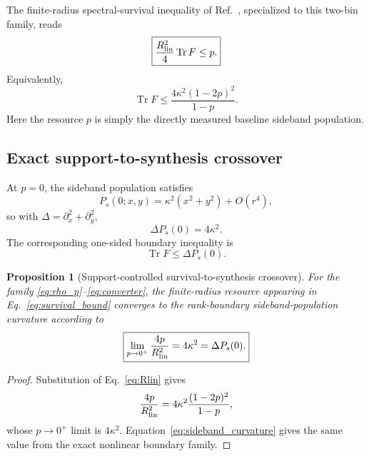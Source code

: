 \documentclass[aps,pra,reprint,superscriptaddress,longbibliography]{revtex4-2}
\newtheorem{proposition}{Proposition}
\newcommand{\Tr}{\operatorname{Tr}}
\begin{document}
The finite-radius spectral-survival inequality of Ref.~\cite{CompanionTwoRegimes2026}, specialized to this two-bin family, reads
\begin{equation}
\boxed{
\frac{R_{\rm lin}^2}{4}\Tr F\le p.}
\label{eq:survival_bound}
\end{equation}
Equivalently,
\begin{equation}
\Tr F\le\frac{4\kappa^2(1-2p)^2}{1-p}.
\label{eq:survival_ceiling}
\end{equation}
Here the resource $p$ is simply the directly measured baseline sideband population.

\subsection{Exact support-to-synthesis crossover}

At $p=0$, the sideband population satisfies
\begin{equation}
P_s(0;x,y)=\kappa^2(x^2+y^2)+O(r^4),
\end{equation}
so with $\Delta=\partial_x^2+\partial_y^2$,
\begin{equation}
\boxed{\Delta P_s(0)=4\kappa^2.}
\label{eq:sideband_curvature}
\end{equation}
The corresponding one-sided boundary inequality is
\begin{equation}
\Tr F\le\Delta P_s(0).
\label{eq:boundary_bound}
\end{equation}

\begin{proposition}[Support-controlled survival-to-synthesis crossover]
For the family \eqref{eq:rho_p}--\eqref{eq:converter}, the finite-radius resource appearing in Eq.~\eqref{eq:survival_bound} converges to the rank-boundary sideband-population curvature according to
\begin{equation}
\boxed{
\lim_{p\to0^+}\frac{4p}{R_{\rm lin}^2}
=4\kappa^2
=\Delta P_s(0).}
\label{eq:main_crossover}
\end{equation}
\end{proposition}

\begin{proof}
Substitution of Eq.~\eqref{eq:Rlin} gives
\begin{equation}
\frac{4p}{R_{\rm lin}^2}
=4\kappa^2\frac{(1-2p)^2}{1-p},
\end{equation}
whose $p\to0^+$ limit is $4\kappa^2$. Equation~\eqref{eq:sideband_curvature} gives the same value from the exact nonlinear boundary family.
\end{proof}
\end{document}
